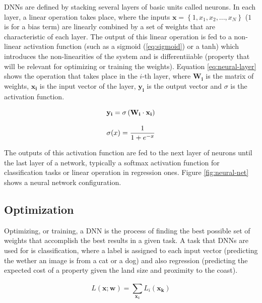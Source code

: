 DNNs are defined by stacking several layers of basic units called neurons. In each layer, a linear operation takes place, where the inputs $\mathbf{x}= \left \{ 1, x_1, x_2, ..., x_N \right \}$ ($1$ is for a bias term) are linearly combined by a set of weights that are characteristic of each layer. The output of this linear operation is fed to a non-linear activation function (such as a sigmoid (\ref{eq:sigmoid}) or a tanh) which introduces the non-linearities of the system and is differentiiable (property that will be relevant for optimizing or training the weights). Equation \ref{eq:neural-layer} shows the operation that takes place in the $i$-th layer, where $\mathbf{W_i}$  is the matrix of weights, $\mathbf{x_i}$ is the input vector of the layer, $\mathbf{y_i}$ is the output vector and $\sigma$ is the activation function.

\begin{equation}
    \centering
    \mathbf{y_i} = \sigma \left ( \mathbf{W_i} \cdot \mathbf{x_i} \right )
    \label{eq:neural-layer}
\end{equation}

\begin{equation}
    \centering
    \sigma (x) = \frac{1}{1 + e^{-x}} 
    \label{eq:sigmoid}
\end{equation}

The outputs of this activation function are fed to the next layer of neurons until the last layer of a network, typically a softmax activation function for classification tasks or linear operation in regression ones. Figure \ref{fig:neural-net} shows a neural network configuration.

\subsection{Optimization}

Optimizing, or training, a DNN is the process of finding the best possible set of weights that accomplish the best results in a given task. A task that DNNs are used for is classification, where a label is assigned to each input vector (predicting the wether an image is from a cat or a dog) and also regression (predicting the expected cost of a property given the land size and proximity to the coast).

\begin{equation}
    L(\mathbf{x}; \mathbf{w}) = \sum_{\mathbf{x}_k}^{} L_i (\mathbf{x_k})
    \label{eq:loss}
\end{equation}

